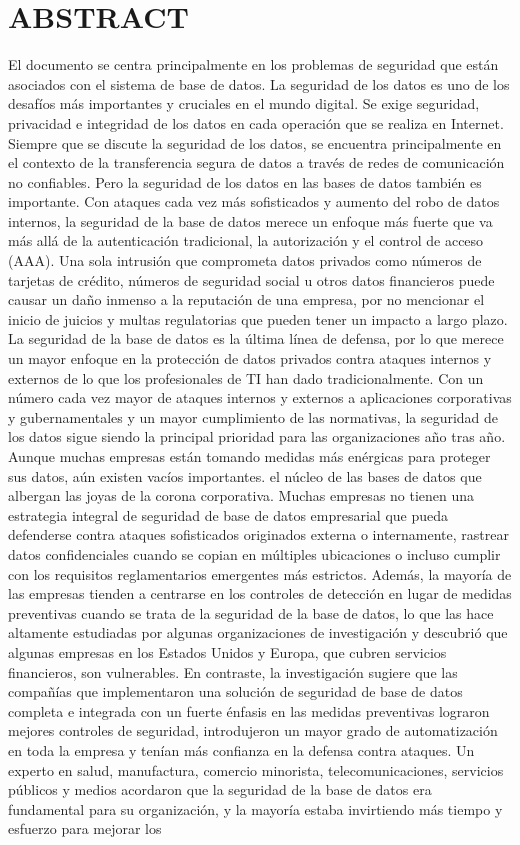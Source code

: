 \section{ABSTRACT}

El documento se centra principalmente en los problemas de seguridad que están asociados con el sistema de base de datos. La seguridad de los datos es uno de los desafíos más importantes y cruciales en el mundo digital. Se exige seguridad, privacidad e integridad de los datos en cada operación que se realiza en Internet. Siempre que se discute la seguridad de los datos, se encuentra principalmente en el contexto de la transferencia segura de datos a través de redes de comunicación no confiables. Pero la seguridad de los datos en las bases de datos también es importante. Con ataques cada vez más sofisticados y aumento del robo de datos internos, la seguridad de la base de datos merece un enfoque más fuerte que va más allá de la autenticación tradicional, la autorización y el control de acceso (AAA). Una sola intrusión que comprometa datos privados como números de tarjetas de crédito, números de seguridad social u otros datos financieros puede causar un daño inmenso a la reputación de una empresa, por no mencionar el inicio de juicios y multas regulatorias que pueden tener un impacto a largo plazo. La seguridad de la base de datos es la última línea de defensa, por lo que merece un mayor enfoque en la protección de datos privados contra ataques internos y externos de lo que los profesionales de TI han dado tradicionalmente. Con un número cada vez mayor de ataques internos y externos a aplicaciones corporativas y gubernamentales y un mayor cumplimiento de las normativas, la seguridad de los datos sigue siendo la principal prioridad para las organizaciones año tras año. Aunque muchas empresas están tomando medidas más enérgicas para proteger sus datos, aún existen vacíos importantes. el núcleo de las bases de datos que albergan las joyas de la corona corporativa. Muchas empresas no tienen una estrategia integral de seguridad de base de datos empresarial que pueda defenderse contra ataques sofisticados originados externa o internamente, rastrear datos confidenciales cuando se copian en múltiples ubicaciones o incluso cumplir con los requisitos reglamentarios emergentes más estrictos. Además, la mayoría de las empresas tienden a centrarse en los controles de detección en lugar de medidas preventivas cuando se trata de la seguridad de la base de datos, lo que las hace altamente estudiadas por algunas organizaciones de investigación y descubrió que algunas empresas en los Estados Unidos y Europa, que cubren servicios financieros, son vulnerables. En contraste, la investigación sugiere que las compañías que implementaron una solución de seguridad de base de datos completa e integrada con un fuerte énfasis en las medidas preventivas lograron mejores controles de seguridad, introdujeron un mayor grado de automatización en toda la empresa y tenían más confianza en la defensa contra ataques. Un experto en salud, manufactura, comercio minorista, telecomunicaciones, servicios públicos y medios acordaron que la seguridad de la base de datos era fundamental para su organización, y la mayoría estaba invirtiendo más tiempo y esfuerzo para mejorar los 